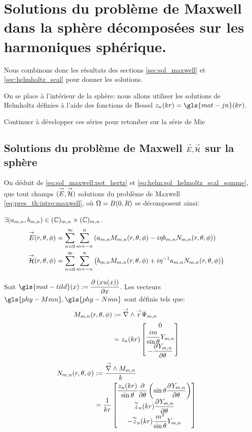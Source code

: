 \section{Solutions du problème de Maxwell dans la sphère décomposées sur les harmoniques sphérique.}\label{sec:maxwell_harmonique}

Nous combinons donc les résultats des sections \ref{sec:sol_maxwell} et \ref{sec:helmholtz_scal} pour donner les solutions.

On se place à l'intérieur de la sphère: nous allons utiliser les solutions de Helmholtz définies à l'aide des fonctions de Bessel \(z_n(kr) = \gls{mat-jn}(kr)\).


\begin{TODO}
  Continuer à développer ces séries pour retomber sur la série de Mie
\end{TODO}

\subsection{Solutions du problème de Maxwell \({\overset{\rightarrow}{E}},{\overset{\rightarrow}{\mathcal{H}}}\) sur la sphère}
On déduit de  \eqref{eq:sol_maxwell:pot_hertz} et \eqref{eq:helm:sol_helmoltz_scal_somme}, que tout champs \(({\overset{\rightarrow}{E}},{\overset{\rightarrow}{\mathcal{H}}})\) solutions du problème de Maxwell \eqref{eq:pres_th:intro:maxwell}, où \(\Omega = B(0,R)\) se décomposent ainsi:

\(\exists (a_{m,n},b_{m,n}) \in (\mathbb C)_{m,n}\times (\mathbb C)_{m,n}\).
\begin{align*}
  {\overset{\rightarrow}{E}}(r,\theta,\phi) &= \sum\limits_{n=0}^\infty\sum\limits_{m=-n}^n\left( a_{m,n}   M_{m,n}(r,\theta,\phi) - i \eta b_{m,n} N_{m,n}(r,\theta,\phi)\right)\\
  {\overset{\rightarrow}{\mathcal{H}}}(r,\theta,\phi) &= \sum\limits_{n=0}^\infty\sum\limits_{m=-n}^n\left( b_{m,n}   M_{m,n}(r,\theta,\phi) + i {\eta}^{-1} a_{m,n} N_{m,n}(r,\theta,\phi)\right)
\end{align*}

Soit \(\gls{mat-tild}(x) := \ddr{x}{\left(xu(x)\right)}\). Les vecteurs \(\gls{phy-Mmn} ,\gls{phy-Nmn}\) sont définis tels que:
\begin{align}
 \label{eq:defMmn}
  M_{m,n}(r,\theta,\phi) &:= {\overset{\rightarrow}{\nabla}}\wedge {\overset{\rightarrow}{r}} \Psi_{m,n} \\
  &= z_n(kr)
  \begin{bmatrix}
    0 \\ \dfrac{im}{\sin\theta}Y_{m,n}\\
    - \dfrac{\partial^{{}} Y_{m,n}}{{\partial \theta}^{{}}}
  \end{bmatrix}
\end{align}
\begin{align}
\label{eq:defNmn}
  N_{m,n}(r,\theta,\phi) &:= \dfrac{{\overset{\rightarrow}{\nabla}}\wedge M_{m,n}}{k} \\
  &= \dfrac{1}{kr}\begin{bmatrix}
    \dfrac{z_n(kr)}{\sin\theta}\dfrac{\partial^{{}} }{{\partial \theta}^{{}}}\left(\sin\theta\dfrac{\partial^{{}} Y_{m,n}}{{\partial \theta}^{{}}}\right)\\
    \overset{\thicksim}{z}_n(kr)\dfrac{\partial^{{}} Y_{m,n}}{{\partial \theta}^{{}}}\\
    -\overset{\thicksim}{z}_n(kr)\dfrac{m^2}{\sin\theta}Y_{m,n}\\
  \end{bmatrix}
\end{align}


